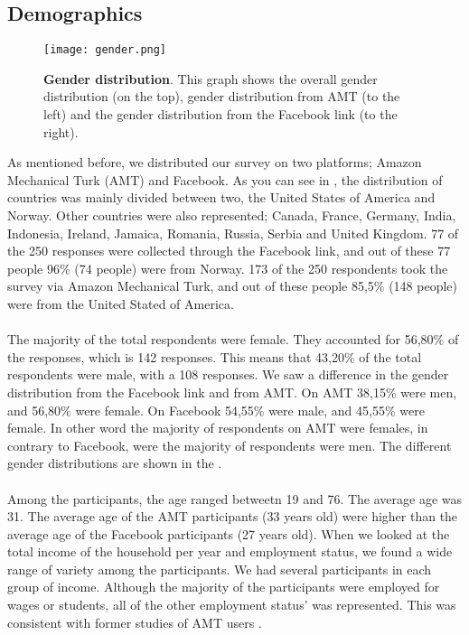 \subsection{Demographics}

\begin{figure}[h!]
\centering
\texttt{[image: gender.png]}
\caption[Gender distribution]{\textbf{Gender distribution}. This graph shows the overall gender distribution (on the top), gender distribution from AMT (to the left) and the gender distribution from the Facebook link (to the right).} 
\label{fig:gender}
\end{figure}

As mentioned before, we distributed our survey on two platforms; Amazon Mechanical Turk (AMT) and Facebook. As you can see in , the distribution of countries was mainly divided between two, the United States of America and Norway. Other countries were also represented; Canada, France, Germany, India, Indonesia, Ireland, Jamaica, Romania, Russia, Serbia and United Kingdom. 77 of the 250 responses were collected through the Facebook link, and out of these 77 people 96\% (74 people) were from Norway. 173 of the 250 respondents took the survey via Amazon Mechanical Turk, and out of these people 85,5\% (148 people) were from the United Stated of America. 

\paragraph{}
The majority of the total respondents were female. They accounted for 56,80\% of the responses, which is 142 responses. This means that 43,20\% of the total respondents were male, with a 108 responses. We saw a difference in the gender distribution from the Facebook link and from AMT. On AMT 38,15\% were men, and 56,80\% were female. On Facebook 54,55\% were male, and 45,55\% were female. In other word the majority of respondents on AMT were females, in contrary to Facebook, were the majority of respondents were men. The different gender distributions are shown in the .
 
\paragraph{}
Among the participants, the age ranged betweetn 19 and 76. The average age was 31. The average age of the AMT participants (33 years old) were higher than the average age of the Facebook participants (27 years old). When we looked at the total income of the household per year and employment status, we found a wide range of variety among the participants. We had several participants in each group of income. Although the majority of the participants were employed for wages or students, all of the other employment status' was represented. This was consistent with former studies of AMT users \cite{incentivesAmt}. 


